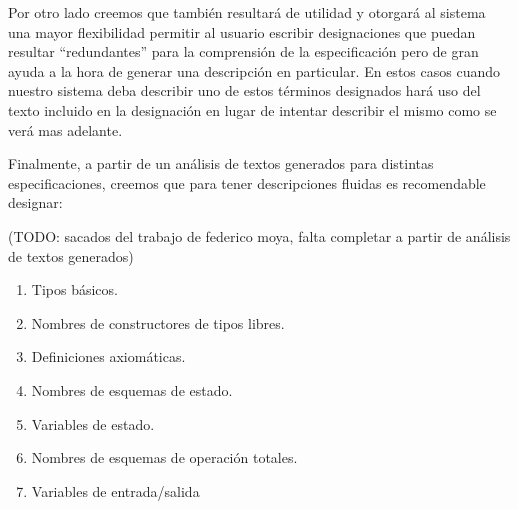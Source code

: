Por otro lado creemos que también resultará de utilidad y otorgará al sistema una mayor flexibilidad permitir al usuario escribir designaciones que puedan resultar ``redundantes'' para la comprensión de la especificación pero de gran ayuda a la hora de generar una descripción en particular. En estos casos cuando nuestro sistema deba describir uno de estos términos designados hará uso del texto incluido en la designación en lugar de intentar describir el mismo como se verá mas adelante.

Finalmente, a partir de un análisis de textos generados para distintas especificaciones, creemos que para tener descripciones fluidas es recomendable designar:

(TODO: sacados del trabajo de federico moya, falta completar a partir de análisis de textos generados)

\begin{enumerate}[itemsep=0pt]
  \item Tipos básicos.
  \item Nombres de constructores de tipos libres.
  \item Definiciones axiomáticas.
  \item Nombres de esquemas de estado.
  \item Variables de estado.
  \item Nombres de esquemas de operación totales.
  \item Variables de entrada/salida
\end{enumerate}